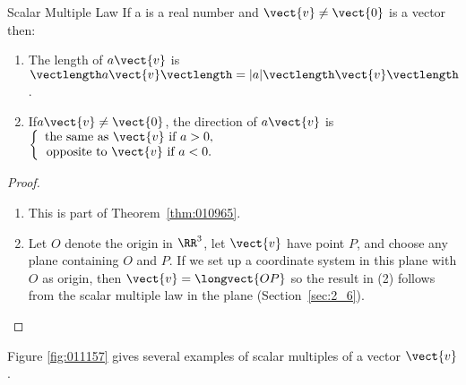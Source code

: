 \begin{theorem*}[label=thm:011136]{Scalar Multiple Law}
If a is a real number and $\vect{v} \neq \vect{0}$ is a vector then:

\begin{enumerate}
\item The length of $a\vect{v}$ is $\vectlength a\vect{v}\vectlength = |a| \vectlength\vect{v}\vectlength$.

\item If\footnotemark $a\vect{v} \neq \vect{0}$, the direction of $a\vect{v}$ is 
$\left\lbrace
\begin{array}{c}
\mbox{the same as } \vect{v} \mbox{ if } a > 0, \\
\mbox{opposite to } \vect{v} \mbox{ if } a < 0.
\end{array}
\right.
$
 
\end{enumerate}
\end{theorem*}

\begin{proof}
\begin{enumerate}
\item This is part of Theorem~\ref{thm:010965}.

\item Let $O$ denote the origin in $\RR^3$, let $\vect{v}$ have point $P$, and choose any plane containing $O$ and $P$. If we set up a coordinate system in this plane with $O$ as origin, then $\vect{v} = \longvect{OP}$ so the result in (2) follows from the scalar multiple law in the plane (Section~\ref{sec:2_6}).
\end{enumerate}
\vspace*{-2em}\end{proof}


\noindent Figure \ref{fig:011157} gives several examples of scalar multiples of a vector $\vect{v}$.


\begin{wrapfigure}[8]{l}{5cm}
\vspace{-1em} 
\centering

\caption{\label{fig:011157}}
\vspace{1em}

\caption{\label{fig:011160}}
\end{wrapfigure}

